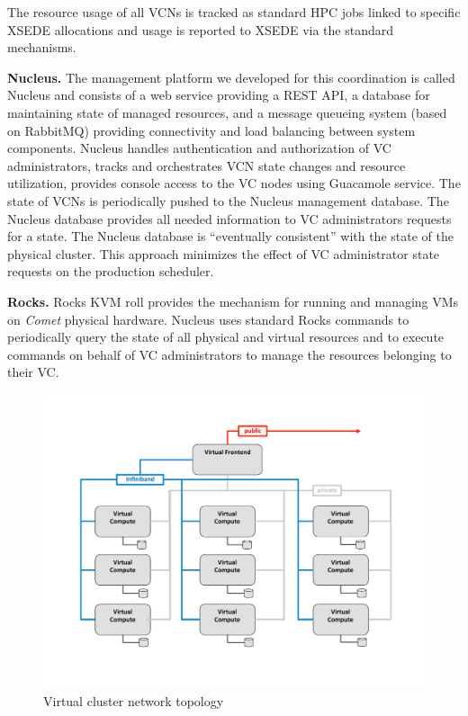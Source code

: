 The resource usage of all VCNs is tracked as standard HPC jobs linked to
specific XSEDE allocations and usage is reported to XSEDE via the standard
mechanisms.

{\parindent 0pt \bf Nucleus.} The management platform we developed for this
coordination is called Nucleus and consists of a web service providing a REST API, a
database for maintaining state of managed resources, and a message queueing
system (based on RabbitMQ) providing connectivity and load balancing between
system components. Nucleus handles authentication and authorization of VC
administrators, tracks and orchestrates VCN state changes and resource
utilization, provides console access to the VC nodes using Guacamole
service. The state of VCNs is periodically pushed to the Nucleus management
database. The Nucleus database provides all needed information to VC
administrators requests for a state. The Nucleus database is ``eventually
consistent'' with the state of the physical cluster. This approach minimizes the
effect of VC administrator state requests on the production scheduler.

{\parindent 0pt \bf Rocks.} Rocks KVM roll provides the mechanism for running and
managing VMs on {\em Comet\/} physical hardware. Nucleus uses standard Rocks
commands to periodically query the state of all physical and virtual resources
and to execute commands on behalf of VC administrators to manage the resources
belonging to their VC.

\begin{figure}[!h]
\vspace{-.5cm}
     \hspace{-1.0cm} \includegraphics[width=1.2\columnwidth]{images/arch2}
\vspace{-1.5cm}
    \caption{Virtual cluster network topology}
\label{F:arch2}
\end{figure}

